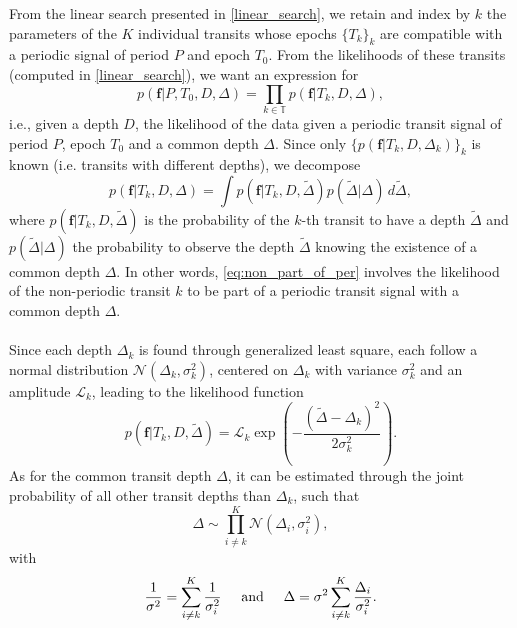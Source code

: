 \documentclass[modern]{aastex631}
\begin{document}
\newcommand{\sumTk}{i\neq k}
From the linear search presented in \autoref{linear_search}, we retain and index by $k$ the parameters of the $K$ individual transits whose epochs $\{T_k\}_k$ are compatible with a periodic signal of period $P$ and epoch $T_0$. From the likelihoods of these transits (computed in \autoref{linear_search}), we want an expression for
\begin{equation*}
    p(\bm{f} \vert P, T_0 ,D, \Delta) = \prod_{k\in\mathbb{T}} p(\bm{f} \vert T_k, D, \Delta),
\end{equation*}
i.e., given a depth $D$, the likelihood of the data given a periodic transit signal of period $P$, epoch $T_0$ and a common depth $\Delta$. Since only $\{p(\bm{f} \vert T_k, D, \Delta_k)\}_{k}$ is known (i.e. transits with different depths), we decompose
\begin{equation}\label{eq:non_part_of_per}
    p(\bm{f} \vert T_k, D, \Delta) = \int p(\bm{f} \vert T_k, D, \tilde\Delta)p(\tilde\Delta | \Delta)\, d\tilde\Delta,
\end{equation}
where $p(\bm{f} \vert T_k, D, \tilde\Delta)$ is the probability of the $k$-th transit to have a depth $\tilde\Delta$ and $p(\tilde\Delta | \Delta)$ the probability to observe the depth $\tilde\Delta$ knowing the existence of a common depth $\Delta$. In other words, \autoref{eq:non_part_of_per} involves the likelihood of the non-periodic transit $k$ to be part of a periodic transit signal with a common depth $\Delta$.
\\\\
Since each depth $\Delta_k$ is found through generalized least square, each follow a normal distribution $\mathcal{N}(\Delta_k, \sigma_k^2)$, centered on $\Delta_k$ with variance $\sigma_k^2$ and an amplitude $\mathcal{L}_k$, leading to the likelihood function
\begin{equation*}
    p(\bm{f} \vert T_k, D, \tilde\Delta) = \mathcal{L}_k\exp \left(-\frac{(\tilde\Delta-\Delta_k)^2}{2\sigma_k^2}\right).
\end{equation*}
As for the common transit depth $\Delta$, it can be estimated through the joint probability of all other transit depths than $\Delta_k$, such that
\begin{equation*}
    \Delta \sim \prod_{\sumTk}^K \mathcal{N}(\Delta_i, \sigma_i^2),
\end{equation*}
with 
\begin{equation}\label{eq:params}
\frac{1}{\sigma^2} = \sum_{\sumTk}^K \frac{1}{\sigma_i^2} \hspace{0.5cm} \text{and} \hspace{0.5cm}
\Delta =\sigma^2 \sum_{\sumTk}^K {\frac{\Delta_i}{\sigma_i^2}}.
\end{equation}
\end{document}
